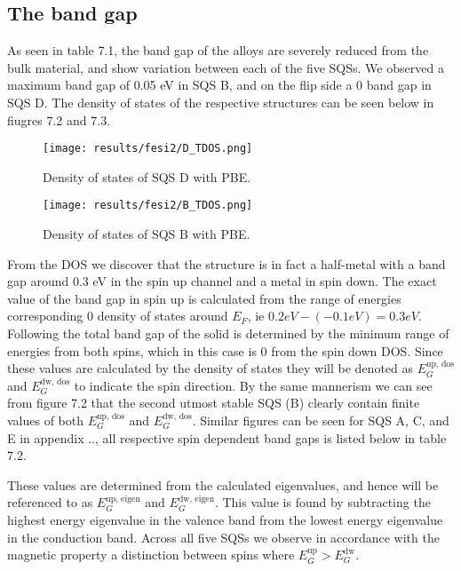 \newpage
\subsection{The band gap}
As seen in table 7.1, the band gap of the alloys are severely reduced from the bulk material, and show variation between each of the five SQSs. We observed a maximum band gap of 0.05 eV in SQS B, and on the flip side a 0 band gap in SQS D. The density of states of the respective structures can be seen below in fiugres 7.2 and 7.3.  

\begin{figure}[H]
	\centering
	\texttt{[image: results/fesi2/D\_TDOS.png]}
	\caption{Density of states of SQS D  with PBE.}
\end{figure}

\begin{figure}[H]
\centering
	\texttt{[image: results/fesi2/B\_TDOS.png]}
	\caption{Density of states of SQS B  with PBE.}
\end{figure}  

From the DOS we discover that the structure is in fact a half-metal with a band gap around 0.3 eV in the spin up channel and a metal in spin down. The exact value of the band gap in spin up is calculated from the range of energies corresponding 0 density of states around $E_F$, ie $ 0.2 eV - (-0.1 eV) = 0.3 eV$. Following the total band gap of the solid is determined by the minimum range of energies from both spins, which in this case is 0 from the spin down DOS. Since these values are calculated by the density of states they will be denoted as $E_G ^\text{up, dos}$ and $E_G ^\text{dw, dos}$ to indicate the spin direction. By the same mannerism we can see from figure 7.2 that the second utmost stable SQS (B) clearly contain finite values of both $E_G ^\text{up, dos}$ and $E_G ^\text{dw, dos}$. Similar figures can be seen for SQS A, C, and E in appendix ..,  all respective spin dependent band gaps is listed below in table 7.2. 

These values are determined from the calculated eigenvalues, and hence will be referenced to as $E_G ^\text{up, eigen}$ and $E_G ^\text{dw, eigen}$. This value is found by subtracting the highest energy eigenvalue in the valence band from the lowest energy eigenvalue in the conduction band. Across all five SQSs we observe in accordance with the magnetic property a distinction between spins where $E_G ^\text{up} > E_G ^\text{dw}$.
 
